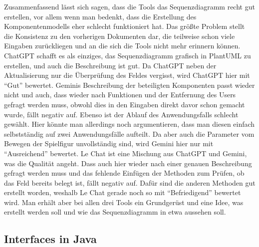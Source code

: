 Zusammenfassend lässt sich sagen, dass die Tools das Sequenzdiagramm recht gut erstellen, vor allem wenn man bedenkt, dass die 
Erstellung des Komponentenmodells eher schlecht funktioniert hat. Das größte Problem stellt die Konsistenz zu den vorherigen 
Dokumenten dar, die teilweise schon viele Eingaben zurückliegen und an die sich die Tools nicht mehr erinnern können. ChatGPT schafft 
es als einziges, das Sequenzdiagramm grafisch in PlantUML zu erstellen, und auch die Beschreibung ist gut. Da ChatGPT neben der 
Aktualisierung nur die Überprüfung des Feldes vergisst, wird ChatGPT hier mit ``Gut'' bewertet. Geminis Beschreibung der beteiligten 
Komponenten passt wieder nicht und auch, dass wieder nach Funktionen und der Entfernung des Users gefragt werden muss, obwohl dies in 
den Eingaben direkt davor schon gemacht wurde, fällt negativ auf. Ebenso ist der Ablauf des Anwendungsfalls schlecht gewählt. Hier 
könnte man allerdings noch argumentieren, dass man diesen einfach selbstständig auf zwei Anwendungsfälle aufteilt. Da aber auch die 
Parameter vom Bewegen der Spielfigur unvollständig sind, wird Gemini hier nur mit ``Ausreichend'' bewertet. Le Chat ist eine Mischung 
aus ChatGPT und Gemini, was die Qualität angeht. Dass auch hier wieder nach einer genauen Beschreibung gefragt werden muss und das 
fehlende Einfügen der Methoden zum Prüfen, ob das Feld bereits belegt ist, fällt negativ auf. Dafür sind die anderen Methoden gut 
erstellt worden, weshalb Le Chat gerade noch so mit ``Befriedigend'' bewertet wird. Man erhält aber bei allen drei Tools ein Grundgerüst 
und eine Idee, was erstellt werden soll und wie das Sequenzdiagramm in etwa aussehen soll.

\subsection*{Interfaces in Java}

